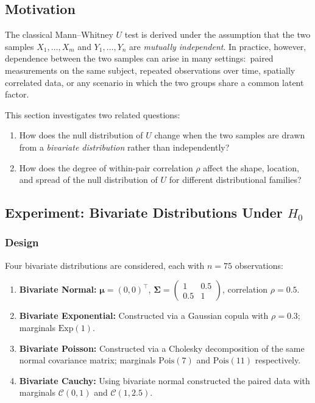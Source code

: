 \documentclass[10pt]{article}
\begin{document}
\subsection{Motivation}

The classical Mann--Whitney $U$ test is derived under the assumption
that the two samples $X_1,\ldots,X_m$ and $Y_1,\ldots,Y_n$ are
\emph{mutually independent}.  In practice, however, dependence
between the two samples can arise in many settings:\ paired
measurements on the same subject, repeated observations over time,
spatially correlated data, or any scenario in which the two groups
share a common latent factor.

This section investigates two related questions:
\begin{enumerate}[label=(\roman*)]
  \item How does the null distribution of $U$ change when the two
        samples are drawn from a \emph{bivariate distribution} rather
        than independently?
  \item How does the degree of within-pair correlation $\rho$ affect
        the shape, location, and spread of the null distribution of
        $U$ for different distributional families?
\end{enumerate}

\subsection{Experiment: Bivariate Distributions Under $H_0$}

\subsubsection{Design}

Four bivariate distributions are considered, each with $n = 75$
observations:
\begin{enumerate}[noitemsep, label=(\roman*)]
  \item \textbf{Bivariate Normal:}
        $\boldsymbol{\mu} = (0,0)^\top$,
        $\boldsymbol{\Sigma} = \begin{pmatrix}1 & 0.5\\0.5 & 1
        \end{pmatrix}$, correlation $\rho = 0.5$.
  \item \textbf{Bivariate Exponential:}
        Constructed via a Gaussian copula with $\rho = 0.3$;
        marginals $\text{Exp}(1)$.
  \item \textbf{Bivariate Poisson:}
        Constructed via a Cholesky decomposition of the same
        normal covariance matrix; marginals $\text{Pois}(7)$ and
        $\text{Pois}(11)$ respectively.
  \item \textbf{Bivariate Cauchy:}
    Using bivariate normal constructed the paired data with marginals $\mathcal{C}(0,1)$ and $\mathcal{C}(1,2.5)$.
\end{enumerate}
\end{document}
